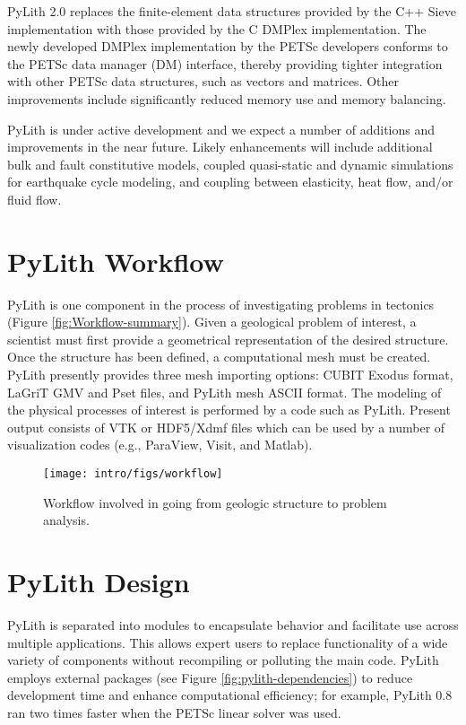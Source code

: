 PyLith 2.0 replaces the finite-element data structures provided by the
C++ Sieve implementation with those provided by the C DMPlex
implementation.  The newly developed DMPlex implementation by the
PETSc developers conforms to the PETSc data manager (DM) interface,
thereby providing tighter integration with other PETSc data
structures, such as vectors and matrices. Other improvements include
significantly reduced memory use and memory balancing.

PyLith is under active development and we expect a number of additions
and improvements in the near future. Likely enhancements will include
additional bulk and fault constitutive models, coupled quasi-static
and dynamic simulations for earthquake cycle modeling, and coupling
between elasticity, heat flow, and/or fluid flow.


\section{PyLith Workflow}

PyLith is one component in the process of investigating problems in
tectonics (Figure \vref{fig:Workflow-summary}). Given a geological
problem of interest, a scientist must first provide a geometrical
representation of the desired structure. Once the structure has been
defined, a computational mesh must be created. PyLith presently
provides three mesh importing options: CUBIT Exodus format, LaGriT GMV
and Pset files, and PyLith mesh ASCII format. The modeling of the
physical processes of interest is performed by a code such as
PyLith. Present output consists of VTK or HDF5/Xdmf files which can be
used by a number of visualization codes (e.g., ParaView, Visit, and
Matlab).

\begin{figure}[htbp]
  \texttt{[image: intro/figs/workflow]}
  \caption{Workflow involved in going from geologic structure to
    problem analysis.}
  \label{fig:Workflow-summary}
\end{figure}

\section{PyLith Design}

PyLith is separated into modules to encapsulate behavior and facilitate
use across multiple applications. This allows expert users to replace
functionality of a wide variety of components without recompiling
or polluting the main code. PyLith employs external packages (see
Figure \vref{fig:pylith-dependencies}) to reduce development time
and enhance computational efficiency; for example, PyLith 0.8 ran
two times faster when the PETSc linear solver was used.

